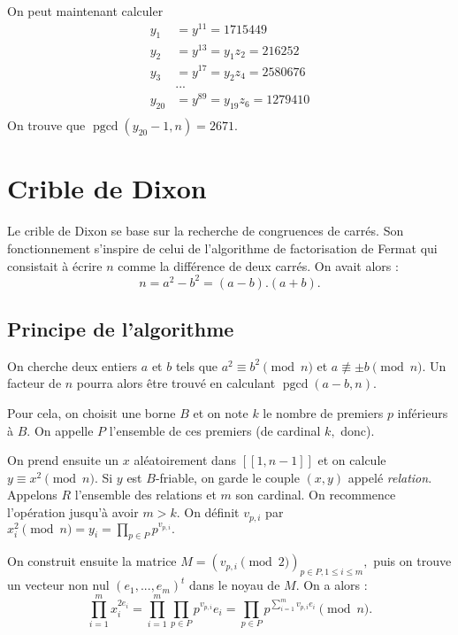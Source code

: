 \documentclass[french, 12pt, titlepage]{article}
\DeclareMathOperator{\pgcd}{pgcd}
\begin{document}
On peut maintenant calculer
\begin{align*}
  y_1 &= y^{11} = 1715449\\
  y_2 &= y^{13} = y_1 z_2 = 216252\\
  y_3 &= y^{17} = y_2 z_4 = 2580676\\
  & ... \\
  y_{20} &= y^{89} = y_{19} z_6 = 1279410\\
\end{align*}
On trouve que $ \pgcd (y_{20} - 1, n) = 2671.$





\section{Crible de Dixon}

Le crible de Dixon se base sur la recherche de congruences de
carrés. Son fonctionnement s'inspire de celui de l'algorithme de
factorisation de Fermat qui consistait à écrire $n$ comme la
différence de deux carrés. On avait alors : \[n = a^2 - b^2 = (a - b).(a + b).\]

\subsection{Principe de l'algorithme}

On cherche deux entiers $a$ et $b$ tels que $a^2 \equiv b^2 \pmod n$ et $a \nequiv \pm{b} \pmod n.$ Un facteur de $n$ pourra alors être trouvé en calculant
$\pgcd(a - b, n).$

Pour cela, on choisit une borne $B$ et on note $k$ le nombre de
premiers $p$ inférieurs à $B.$ On appelle $P$ l'ensemble de ces
premiers (de cardinal $k,$ donc).

On prend ensuite un $x$ aléatoirement dans $[\![1, n - 1]\!]$ et
on calcule $y \equiv x^2 \pmod n.$ Si $y$ est $B$-friable, on garde le
couple $(x, y)$ appelé \textit{relation}. Appelons $R$ l'ensemble des
relations et $m$ son cardinal. On recommence l'opération jusqu'à
avoir $m > k.$ On définit $v_{p, i}$ par $x_i^2 \pmod n = y_i = \prod\limits_{p \in P} p^{v_{p, i}}.$

On construit ensuite la matrice $M = (v_{p, i} \pmod 2)_{p \in P, 1
  \leq i \leq m},$ puis on trouve un vecteur non nul $(e_1, ..., e_m)^t$
dans le noyau de $M.$
On a alors : \[\prod\limits_{i=1}^m x_i^{2e_i} = \prod\limits_{i=1}^m \prod\limits_{p \in P} p^{v_{p, i}}e_i = \prod\limits_{p \in P} p^{\sum\limits_{i=1}^m v_{p, i}e_i} \pmod n.\]
\end{document}

